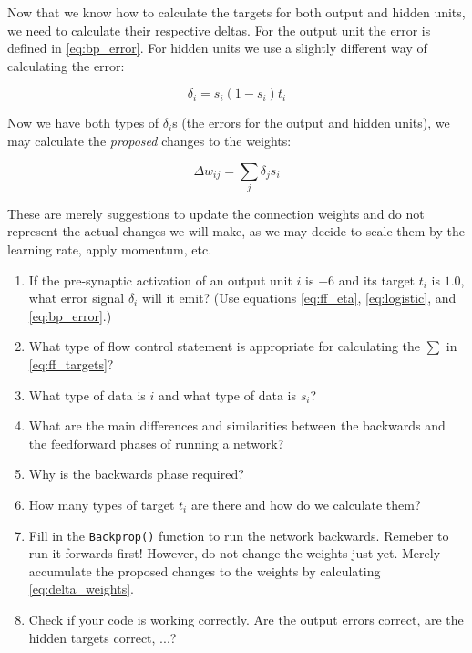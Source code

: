 \documentclass[a4paper,10pt]{article}
\begin{document}
Now that we know how to calculate the targets for both output and hidden units, we need to calculate their respective deltas. For the output unit the error is defined in \autoref{eq:bp_error}. For hidden units we use a slightly different way of calculating the error:

\begin{equation}
\label{eq:hidden_error}
\delta_i = s_i (1 - s_i)  t_i
\end{equation}

Now we have both types of $\delta_i$s (the errors for the output and hidden units), we may calculate the \emph{proposed} changes to the weights:

\begin{equation}
\label{eq:delta_weights}
\Delta w_{ij}= \sum_j \delta_j s_i
\end{equation}


These are merely suggestions to update the connection weights and do not represent the actual changes we will make, as we may decide to scale them by the learning rate, apply momentum, etc.

\begin{enumerate}
 \item If the pre-synaptic activation of an output unit $i$ is $-6$ and its target $t_i$ is $1.0$, what error signal $\delta_i$ will it emit? (Use equations \ref{eq:ff_eta}, \ref{eq:logistic}, and \ref{eq:bp_error}.)
 
 \item What type of flow control statement is appropriate for calculating the $\sum$ in \autoref{eq:ff_targets}?
 
 \item What type of data is $i$ and what type of data is $s_i$?
 
 \item What are the main differences and similarities between the backwards and the feedforward phases of running a network?
 
 \item Why is the backwards phase required?
 
 \item How many types of target $t_i$ are there and how do we calculate them?

 
 
  \item Fill in the \texttt{Backprop()} function to run the network backwards. Remeber to run it forwards first!  However, do not change the weights just yet. Merely accumulate the proposed changes to the weights by calculating \autoref{eq:delta_weights}. 

 \item Check if your code is working correctly. Are the output errors correct, are the hidden targets correct, ...?

 
 
 \end{enumerate}
\end{document}
